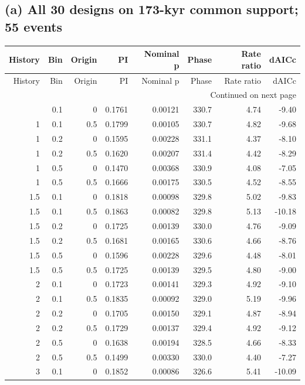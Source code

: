\subsection*{(a) All 30 designs on 173-kyr common support; 55 events}
{\small
\begin{longtable}{rrrrrrrr}
\toprule
History & Bin & Origin & PI & Nominal p & Phase & Rate ratio & dAICc \\
\midrule
\endfirsthead
\toprule
History & Bin & Origin & PI & Nominal p & Phase & Rate ratio & dAICc \\
\midrule
\endhead
\midrule
\multicolumn{8}{r}{Continued on next page} \\
\midrule
\endfoot
\bottomrule
\endlastfoot
1 & 0.1 & 0 & 0.1761 & 0.00121 & 330.7 & 4.74 & -9.40 \\
1 & 0.1 & 0.5 & 0.1799 & 0.00105 & 330.7 & 4.82 & -9.68 \\
1 & 0.2 & 0 & 0.1595 & 0.00228 & 331.1 & 4.37 & -8.10 \\
1 & 0.2 & 0.5 & 0.1620 & 0.00207 & 331.4 & 4.42 & -8.29 \\
1 & 0.5 & 0 & 0.1470 & 0.00368 & 330.9 & 4.08 & -7.05 \\
1 & 0.5 & 0.5 & 0.1666 & 0.00175 & 330.5 & 4.52 & -8.55 \\
1.5 & 0.1 & 0 & 0.1818 & 0.00098 & 329.8 & 5.02 & -9.83 \\
1.5 & 0.1 & 0.5 & 0.1863 & 0.00082 & 329.8 & 5.13 & -10.18 \\
1.5 & 0.2 & 0 & 0.1725 & 0.00139 & 330.0 & 4.76 & -9.09 \\
1.5 & 0.2 & 0.5 & 0.1681 & 0.00165 & 330.6 & 4.66 & -8.76 \\
1.5 & 0.5 & 0 & 0.1596 & 0.00228 & 329.6 & 4.48 & -8.01 \\
1.5 & 0.5 & 0.5 & 0.1725 & 0.00139 & 329.5 & 4.80 & -9.00 \\
2 & 0.1 & 0 & 0.1723 & 0.00141 & 329.3 & 4.92 & -9.10 \\
2 & 0.1 & 0.5 & 0.1835 & 0.00092 & 329.0 & 5.19 & -9.96 \\
2 & 0.2 & 0 & 0.1705 & 0.00150 & 329.1 & 4.87 & -8.94 \\
2 & 0.2 & 0.5 & 0.1729 & 0.00137 & 329.4 & 4.92 & -9.12 \\
2 & 0.5 & 0 & 0.1638 & 0.00194 & 328.5 & 4.66 & -8.33 \\
2 & 0.5 & 0.5 & 0.1499 & 0.00330 & 330.0 & 4.40 & -7.27 \\
3 & 0.1 & 0 & 0.1852 & 0.00086 & 326.6 & 5.41 & -10.09 \\

\end{longtable}}
